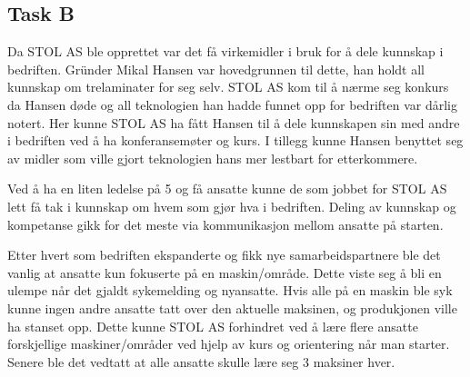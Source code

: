 \subsection{Task B}
Da STOL AS ble opprettet var det få virkemidler i bruk for å dele kunnskap i bedriften. 
Gründer Mikal Hansen var hovedgrunnen til dette, han holdt all kunnskap om trelaminater for seg selv. STOL AS kom til å nærme seg konkurs da Hansen døde og all teknologien han hadde funnet opp for bedriften var dårlig notert. 
Her kunne STOL AS ha fått Hansen til å dele kunnskapen sin med andre i bedriften ved å ha konferansemøter og kurs. I tillegg kunne Hansen benyttet seg av midler som ville gjort teknologien hans mer lestbart for etterkommere.

Ved å ha en liten ledelse på 5 og få ansatte kunne de som jobbet for STOL AS lett få tak i kunnskap om hvem som gjør hva i bedriften. Deling av kunnskap og kompetanse gikk for det meste via kommunikasjon mellom ansatte på starten.

Etter hvert som bedriften ekspanderte og fikk nye samarbeidspartnere ble det vanlig at ansatte kun fokuserte på en maskin/område. Dette viste seg å bli en ulempe når det gjaldt sykemelding og nyansatte. 
Hvis alle på en maskin ble syk kunne ingen andre ansatte tatt over den aktuelle maksinen, og produkjonen ville ha stanset opp. 
Dette kunne STOL AS forhindret ved å lære flere ansatte forskjellige maskiner/områder ved hjelp av kurs og orientering når man starter. 
Senere ble det vedtatt at alle ansatte skulle lære seg 3 maksiner hver.



